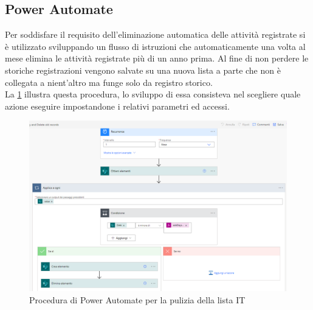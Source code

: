 \subsection{Power Automate}
Per soddisfare il requisito dell'eliminazione automatica delle attività registrate si è utilizzato  sviluppando un flusso di istruzioni che automaticamente una volta al mese elimina le attività registrate più di un anno prima.
Al fine di non perdere le storiche registrazioni vengono salvate su una nuova lista a parte che non è collegata a nient'altro ma funge solo da registro storico.\\
La \figurename \space \ref*{fig:IT-PowerAutomate} illustra questa procedura, lo sviluppo di essa consisteva nel scegliere quale azione eseguire impostandone i relativi parametri ed accessi.
\begin{figure}[H]
  \centering\includegraphics[width=1\textwidth, height=1\textheight,keepaspectratio]{immagini/IT-PowerAutomate.png}
  \caption{Procedura di Power Automate per la pulizia della lista IT}
  \label{fig:IT-PowerAutomate}
\end{figure}
